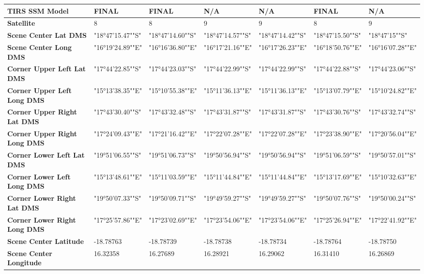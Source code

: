 \documentclass[draft]{agujournal2019}
\begin{document}
\begin{table}
{\begin{tabular}{|l|l|l|l|l|l|l|}
        \textbf{TIRS SSM Model} & FINAL & FINAL & N/A & N/A & FINAL & N/A \\ \hline
        \textbf{Satellite} & 8 & 8 & 9 & 9 & 8 & 9 \\ \hline
        \textbf{Scene Center Lat DMS} & "18°47'15.47""S" & "18°47'14.60""S" & "18°47'14.57""S" & "18°47'14.42""S" & "18°47'15.50""S" & "18°47'15""S" \\ \hline
        \textbf{Scene Center Long DMS} & "16°19'24.89""E" & "16°16'36.80""E" & "16°17'21.16""E" & "16°17'26.23""E" & "16°18'50.76""E" & "16°16'07.28""E" \\ \hline
        \textbf{Corner Upper Left Lat DMS} & "17°44'22.85""S" & "17°44'23.03""S" & "17°44'22.99""S" & "17°44'22.99""S" & "17°44'22.88""S" & "17°44'23.06""S" \\ \hline
        \textbf{Corner Upper Left Long DMS} & "15°13'38.35""E" & "15°10'55.38""E" & "15°11'36.13""E" & "15°11'36.13""E" & "15°13'07.79""E" & "15°10'24.82""E" \\ \hline
        \textbf{Corner Upper Right Lat DMS} & "17°43'30.40""S" & "17°43'32.48""S" & "17°43'31.87""S" & "17°43'31.87""S" & "17°43'30.76""S" & "17°43'32.74""S" \\ \hline
        \textbf{Corner Upper Right Long DMS} & "17°24'09.43""E" & "17°21'16.42""E" & "17°22'07.28""E" & "17°22'07.28""E" & "17°23'38.90""E" & "17°20'56.04""E" \\ \hline
        \textbf{Corner Lower Left Lat DMS} & "19°51'06.55""S" & "19°51'06.73""S" & "19°50'56.94""S" & "19°50'56.94""S" & "19°51'06.59""S" & "19°50'57.01""S" \\ \hline
        \textbf{Corner Lower Left Long DMS} & "15°13'48.61""E" & "15°11'03.59""E" & "15°11'44.84""E" & "15°11'44.84""E" & "15°13'17.69""E" & "15°10'32.63""E" \\ \hline
        \textbf{Corner Lower Right Lat DMS} & "19°50'07.33""S" & "19°50'09.71""S" & "19°49'59.27""S" & "19°49'59.27""S" & "19°50'07.76""S" & "19°50'00.24""S" \\ \hline
        \textbf{Corner Lower Right Long DMS} & "17°25'57.86""E" & "17°23'02.69""E" & "17°23'54.06""E" & "17°23'54.06""E" & "17°25'26.94""E" & "17°22'41.92""E" \\ \hline
        \textbf{Scene Center Latitude} & -18.78763 & -18.78739 & -18.78738 & -18.78734 & -18.78764 & -18.78750 \\ \hline
        \textbf{Scene Center Longitude} & 16.32358 & 16.27689 & 16.28921 & 16.29062 & 16.31410 & 16.26869 \\ \hline

\end{tabular}}
\end{table}
\end{document}
